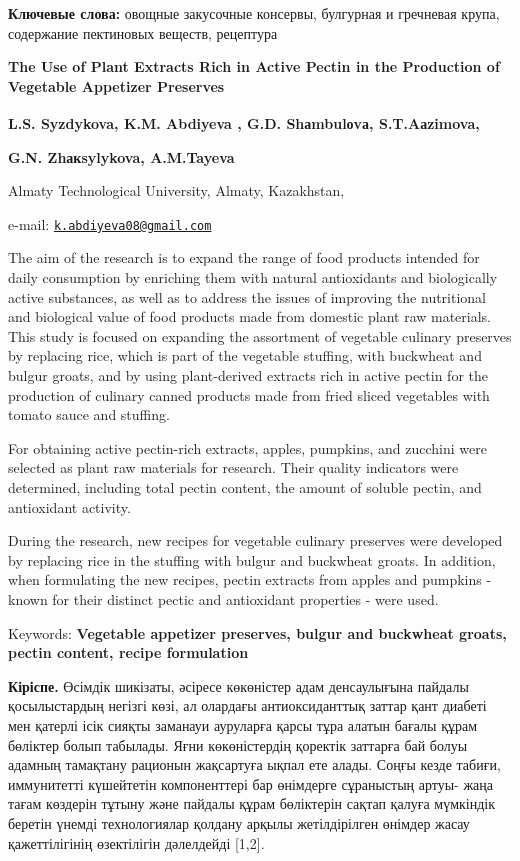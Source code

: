 {\bfseries Ключевые слова:} овощные закусочные консервы, булгурная и
гречневая крупа, содержание пектиновых веществ, рецептура

{\bfseries The Use of Plant Extracts Rich in Active Pectin in the
Production of Vegetable Appetizer Preserves}

{\bfseries L.S. Syzdykova, K.M. Abdiyeva \textsuperscript{\envelope }, G.D.
Shаmbulоvа, S.T.Aаzimova,}

{\bfseries G.N. Zhакsylykova, A.M.Tayeva}

Almaty Technological University, Almaty, Kazakhstan,

e-mail:
\href{mailto:k.abdiyeva08@gmail.com}{\nolinkurl{k.abdiyeva08@gmail.com}}

The aim of the research is to expand the range of food products intended
for daily consumption by enriching them with natural antioxidants and
biologically active substances, as well as to address the issues of
improving the nutritional and biological value of food products made
from domestic plant raw materials. This study is focused on expanding
the assortment of vegetable culinary preserves by replacing rice, which
is part of the vegetable stuffing, with buckwheat and bulgur groats, and
by using plant-derived extracts rich in active pectin for the production
of culinary canned products made from fried sliced vegetables with
tomato sauce and stuffing.

For obtaining active pectin-rich extracts, apples, pumpkins, and
zucchini were selected as plant raw materials for research. Their
quality indicators were determined, including total pectin content, the
amount of soluble pectin, and antioxidant activity.

During the research, new recipes for vegetable culinary preserves were
developed by replacing rice in the stuffing with bulgur and buckwheat
groats. In addition, when formulating the new recipes, pectin extracts
from apples and pumpkins - known for their distinct pectic and
antioxidant properties - were used.

Keywords: {\bfseries Vegetable appetizer preserves, bulgur and buckwheat
groats, pectin content, recipe formulation}

{\bfseries Кіріспе.} Өсімдік шикізаты, әсіресе көкөністер адам денсаулығына
пайдалы қосылыстардың негізгі көзі, ал олардағы антиоксиданттық заттар
қант диабеті мен қатерлі ісік сияқты заманауи ауруларға қарсы тұра
алатын бағалы құрам бөліктер болып табылады. Яғни көкөністердің қоректік
заттарға бай болуы адамның тамақтану рационын жақсартуға ықпал ете
алады. Соңғы кезде табиғи, иммунитетті күшейтетін компоненттері бар
өнімдерге сұраныстың артуы- жаңа тағам көздерін тұтыну және пайдалы
құрам бөліктерін сақтап қалуға мүмкіндік беретін үнемді технологиялар
қолдану арқылы жетілдірілген өнімдер жасау қажеттілігінің өзектілігін
дәлелдейді {[}1,2{]}.

